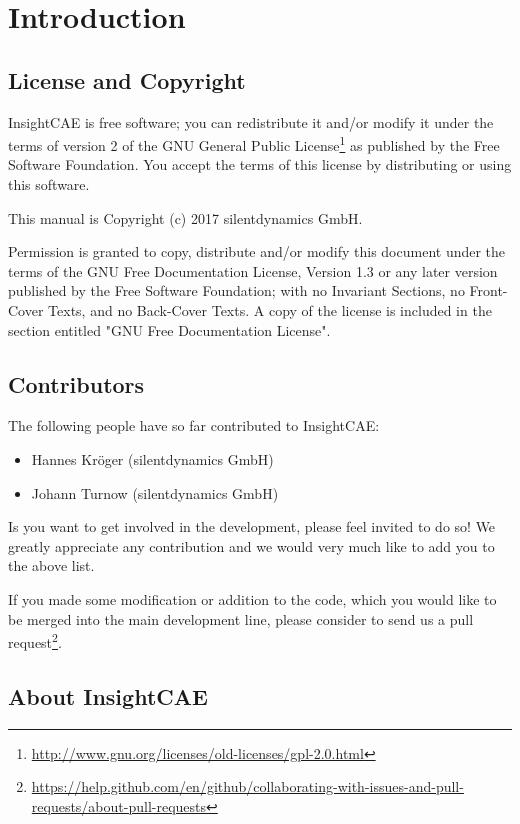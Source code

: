 
\section{Introduction}

\subsection{License and Copyright}

InsightCAE is free software; you can redistribute it and/or modify it under the terms of version 2 of the GNU General Public License\footnote{\url{http://www.gnu.org/licenses/old-licenses/gpl-2.0.html}} as published by the Free Software Foundation. You accept the terms of this license by distributing or using this software.

This manual is Copyright (c) 2017 silentdynamics GmbH.

Permission is granted to copy, distribute and/or modify this document under the terms of the GNU Free Documentation License, Version 1.3 or any later version published by the Free Software Foundation; with no Invariant Sections, no Front-Cover Texts, and no Back-Cover Texts. A copy of the license is included in the section entitled "GNU Free Documentation License".

\subsection{Contributors}

The following people have so far contributed to InsightCAE:
\begin{itemize}
\item Hannes Kröger (silentdynamics GmbH)
\item Johann Turnow (silentdynamics GmbH)
\end{itemize}

Is you want to get involved in the development, please feel invited to do so!
We greatly appreciate any contribution and we would very much like to add you to the above list.

If you made some modification or addition to the code, which you would like to be merged into the main development line, please consider to send us a pull request\footnote{\url{https://help.github.com/en/github/collaborating-with-issues-and-pull-requests/about-pull-requests}}.

\subsection{About InsightCAE}

